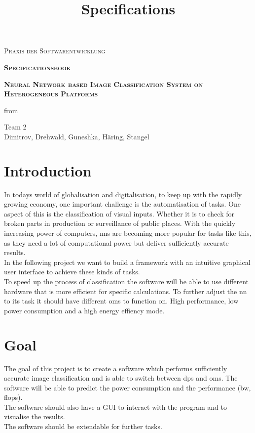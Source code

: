 \documentclass[parskip=full]{scrartcl}
\title{Specifications}
\author{}
\begin{document}
\renewcommand{\figurename}{Figure}
\begin{titlepage}
\centering
	\vspace{3cm}
	{\scshape\LARGE Praxis der Softwarentwicklung\par}
	\vspace{2cm}
	{\scshape\Huge\bfseries Specificationsbook \par}	
	\vspace{2cm}
	{\scshape\Huge\bfseries Neural Network based Image Classification System on Heterogeneous Platforms\par}
	\vspace{2cm}
	{\Large from \par}
	\vspace{0.25cm}
	{\Large Team 2\\Dimitrov, Drehwald, Guneshka, Häring, Stangel \par}
	\vfill
\end{titlepage}
\newpage
\tableofcontents
\newpage
\section{Introduction}
In todays world of globalisation and digitalisation, to keep up with the rapidly growing economy, one important challenge is the automatisation of tasks. One aspect of this is the classification of visual inputs. Whether it is to check for broken parts in production or surveillance of public places. With the quickly increasing power of computers, \glspl{nn} are becoming more popular for tasks like this, as they need a lot of computational power but deliver sufficiently accurate results.\\
In the following project we want to build a framework with an intuitive graphical user interface to achieve these kinds of tasks.\\
To speed up the process of classification the software will be able to use different hardware that is more efficient for specific calculations. To further adjust the \gls{nn} to its task it should have different \glspl{om} to function on. High \gls{performance}, low \gls{power consumption} and a high energy effiency mode.


\section{Goal}
The goal of this project is to create a software which performs sufficiently accurate \gls{image classification} and is able to switch between \glspl{dp} and \glspl{om}. The software will be able to predict the \gls{power consumption} and the \gls{performance} (\gls{bw}, \gls{flops}).\\
The software should also have a GUI to interact with the program and to visualise the results.\\
The software should be extendable for further tasks.
\end{document}

